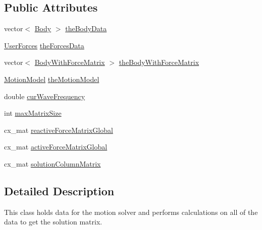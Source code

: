 \subsection*{Public Attributes}
\begin{DoxyCompactItemize}
\item 
vector$<$ \hyperlink{class_body}{Body} $>$ \hyperlink{class_motion_solver_aa706c345b20614a18e9f8f59c6174d2a}{the\-Body\-Data}
\item 
\hyperlink{class_user_forces}{User\-Forces} \hyperlink{class_motion_solver_a9c8dd3a151361ae664c9ff4e9958f649}{the\-Forces\-Data}
\item 
vector$<$ \hyperlink{class_body_with_force_matrix}{Body\-With\-Force\-Matrix} $>$ \hyperlink{class_motion_solver_ac6c73cbeb23091b0064a9a2d0cd0752c}{the\-Body\-With\-Force\-Matrix}
\item 
\hyperlink{class_motion_model}{Motion\-Model} \hyperlink{class_motion_solver_a19e40f754e74afd9f99a3944360165bf}{the\-Motion\-Model}
\item 
double \hyperlink{class_motion_solver_a01ca22785130c0612045094790e2f992}{cur\-Wave\-Frequency}
\item 
int \hyperlink{class_motion_solver_af209f386af69a39839061e436630906c}{max\-Matrix\-Size}
\item 
cx\-\_\-mat \hyperlink{class_motion_solver_a29bb1f9a2fd145b4e8fc74ad711e4351}{reactive\-Force\-Matrix\-Global}
\item 
cx\-\_\-mat \hyperlink{class_motion_solver_a800bc918ff0075782368046bd51eeb87}{active\-Force\-Matrix\-Global}
\item 
cx\-\_\-mat \hyperlink{class_motion_solver_aba617c457e3dab115693c4b3a23f9827}{solution\-Column\-Matrix}
\end{DoxyCompactItemize}


\subsection{Detailed Description}
This class holds data for the motion solver and performs calculations on all of the data to get the solution matrix. 


